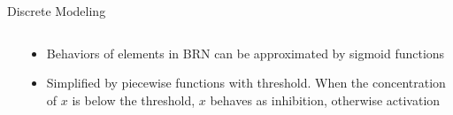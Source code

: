 \documentclass[8pt]{beamer}
\begin{document}
\begin{frame}{Discrete Modeling}
\begin{columns}
\begin{column}{0.5\textwidth}
   
\end{column}
\begin{column}{0.5\textwidth}
\begin{itemize}
\item<+-> Behaviors of elements in BRN can be approximated by sigmoid functions
\item<+-> Simplified by piecewise functions with threshold.
When the concentration of $x$ is below the threshold, $x$ behaves as inhibition, otherwise activation
\end{itemize}
\end{column}
\end{columns}
\end{frame}
\end{document}
